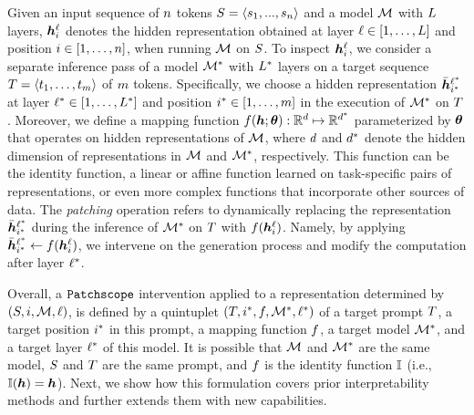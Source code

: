 \documentclass{article}
\theoremstyle{plain}
\theoremstyle{definition}
\theoremstyle{remark}
\begin{document}
Given an input sequence of $n$ tokens $S = \langle s_1, ..., s_{n} \rangle$ and a model $\mathcal{M}$ with $L$ layers, ${\bm{h}}_{i}^{\ell}$ denotes the hidden representation obtained at layer $\ell \in [1, \ldots, L]$ and position $i \in [1, \ldots, n]$, when running $\mathcal{M}$ on $S$. To inspect ${\bm{h}}_{i}^{\ell}$, we consider a separate inference pass of a model $\mathcal{M}^*$ with $L^*$ layers on a target sequence $T = \langle t_1, \ldots, t_{m} \rangle$ of $m$ tokens. Specifically, we choose a hidden representation $\bar{{\bm{h}}}_{i^*}^{\ell^*}$ at layer $\ell^* \in [1, \ldots, L^*]$ and position ${i^*} \in [1, \ldots, m]$ in the execution of $\mathcal{M}^*$ on $T$. Moreover, we define a mapping function $f({{\bm{h}}}; {\bm{\theta}}): \mathbb{R}^{d} \mapsto \mathbb{R}^{d^*}$ parameterized by ${\bm{\theta}}$ that operates on hidden representations of $\mathcal{M}$, where $d$ and $d^*$ denote the hidden dimension of representations in $\mathcal{M}$ and $\mathcal{M}^*$, respectively. This function can be the identity function, a linear or affine function learned on task-specific pairs of representations, or even more complex functions that incorporate other sources of data.
The \textit{patching} operation refers to dynamically replacing the representation $\bar{{\bm{h}}}_{i^*}^{\ell^*}$ during the inference of $\mathcal{M}^*$ on $T$ with $f({\bm{h}}_{i}^{\ell})$.
Namely, by applying ${\bar{{\bm{h}}}}_{i^*}^{\ell^*} \leftarrow f({\bm{h}}_{i}^{\ell})$, we intervene on the generation process and modify the computation after layer $\ell^*$.

Overall, a $\texttt{Patchscope}$ intervention applied to a representation determined by $(S,i,\mathcal{M},\ell)$, 
is defined by a quintuplet $(T,i^*,f,\mathcal{M}^*,\ell^*)$ of a target prompt $T$, a target position $i^*$ in this prompt, a mapping function $f$, a target model $\mathcal{M}^*$, and a target layer $\ell^*$ of this model.
It is possible that $\mathcal{M}$ and $\mathcal{M}^*$ are the same model, $S$ and $T$ are the same prompt, and $f$ is the identity function $\mathbb{I}$ (i.e., $\mathbb{I}({\bm{h}}) = {\bm{h}}$).
Next, we show how this formulation covers prior interpretability methods and further extends them with new capabilities.
 
\end{document}

